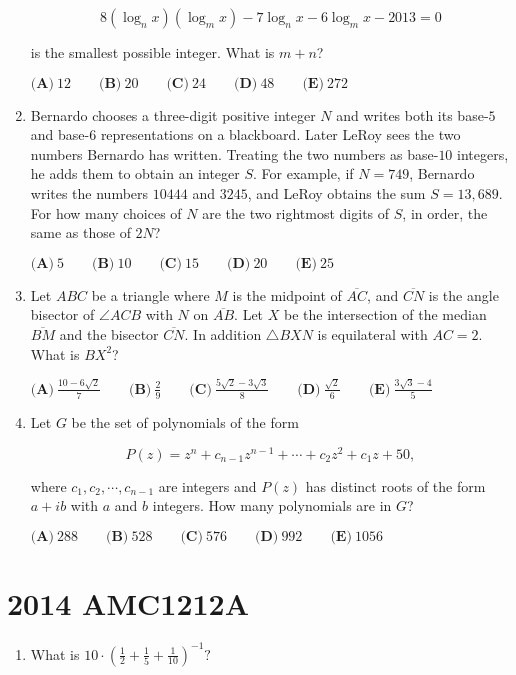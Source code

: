 \documentclass{article}
\begin{document}
\begin{enumerate}[label=\arabic*., itemsep=0.5em]
\begin{equation*}
8(\log_n x)(\log_m x)-7\log_n x-6 \log_m x-2013 = 0
\end{equation*}

is the smallest possible integer. What is $m+n$?

$ \textbf{(A)}\ 12\qquad\textbf{(B)}\ 20\qquad\textbf{(C)}\ 24\qquad\textbf{(D)}\ 48\qquad\textbf{(E)}\ 272 $\par \vspace{0.5em}\item Bernardo chooses a three-digit positive integer $N$ and writes both its base-$5$ and base-$6$ representations on a blackboard. Later LeRoy sees the two numbers Bernardo has written. Treating the two numbers as base-$10$ integers, he adds them to obtain an integer $S$. For example, if $N=749$, Bernardo writes the numbers $10444$ and $3245$, and LeRoy obtains the sum $S=13,689$. For how many choices of $N$ are the two rightmost digits of $S$, in order, the same as those of $2N$?

$ \textbf{(A)}\ 5\qquad\textbf{(B)}\ 10\qquad\textbf{(C)}\ 15\qquad\textbf{(D)}\ 20\qquad\textbf{(E)}\ 25 $\par \vspace{0.5em}\item Let $ABC$ be a triangle where $M$ is the midpoint of $\overline{AC}$, and $\overline{CN}$ is the angle bisector of $\angle{ACB}$ with $N$ on $\overline{AB}$. Let $X$ be the intersection of the median $\overline{BM}$ and the bisector $\overline{CN}$. In addition $\triangle BXN$ is equilateral with $AC=2$. What is $BX^2$?

$\textbf{(A)}\  \frac{10-6\sqrt{2}}{7} \qquad \textbf{(B)}\ \frac{2}{9} \qquad \textbf{(C)}\ \frac{5\sqrt{2}-3\sqrt{3}}{8} \qquad \textbf{(D)}\ \frac{\sqrt{2}}{6} \qquad \textbf{(E)}\ \frac{3\sqrt{3}-4}{5}$\par \vspace{0.5em}\item Let $G$ be the set of polynomials of the form

\begin{equation*}
P(z)=z^n+c_{n-1}z^{n-1}+\cdots+c_2z^2+c_1z+50,
\end{equation*}

where $ c_1,c_2,\cdots, c_{n-1} $ are integers and $P(z)$ has distinct roots of the form $a+ib$ with $a$ and $b$ integers. How many polynomials are in $G$?

$ \textbf{(A)}\ 288\qquad\textbf{(B)}\ 528\qquad\textbf{(C)}\ 576\qquad\textbf{(D)}\ 992\qquad\textbf{(E)}\ 1056 $\par \vspace{0.5em}\end{enumerate}\newpage\section*{2014 AMC1212A}\begin{enumerate}[label=\arabic*., itemsep=0.5em]\item What is $10 \cdot \left(\tfrac{1}{2} + \tfrac{1}{5} + \tfrac{1}{10}\right)^{-1}?$


\end{enumerate}
\end{document}

